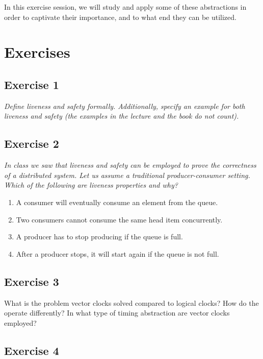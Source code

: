 In this exercise session, we will study and apply some of these abstractions in order to captivate their importance, and to what end they can be utilized.

\section{Exercises}
\label{sec:exercises}

\subsection*{Exercise 1}
\label{sec:exercise_1}

\emph{Define liveness and safety formally. Additionally, specify an example for both liveness and safety (the examples in the lecture and the book do not count).}

\subsection*{Exercise 2}
\label{sec:exercise_2}

\emph{In class we saw that liveness and safety can be employed to prove the correctness of a distributed system. Let us assume a traditional producer-consumer setting. Which of the following are liveness properties and why?}

\begin{enumerate}
\item A consumer will eventually consume an element from the queue.
\item Two consumers cannot consume the same head item concurrently.
\item A producer has to stop producing if the queue is full.
\item After a producer stops, it will start again if the queue is not full.
\end{enumerate}

\subsection*{Exercise 3}
\label{sec:exercise_3}

What is the problem vector clocks solved compared to logical clocks? How do the operate differently? In what type of timing abstraction are vector clocks employed?

\subsection*{Exercise 4}
\label{sec:exercise_4}

